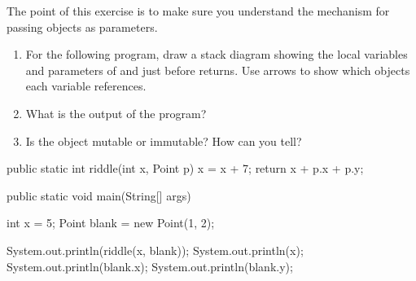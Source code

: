 \begin{exercise}  %

The point of this exercise is to make sure you understand the mechanism for passing objects as parameters.

\begin{enumerate}

\item For the following program, draw a stack diagram showing the local variables and parameters of  and  just before  returns.
Use arrows to show which objects each variable references.

\item What is the output of the program?

\item Is the  object mutable or immutable?
How can you tell?

\end{enumerate}

\begin{code}
public static int riddle(int x, Point p) {
    x = x + 7;
    return x + p.x + p.y;
}
\end{code}

\begin{code}
public static void main(String[] args) {
    int x = 5;
    Point blank = new Point(1, 2);

    System.out.println(riddle(x, blank));
    System.out.println(x);
    System.out.println(blank.x);
    System.out.println(blank.y);
}
\end{code}

\end{exercise}


